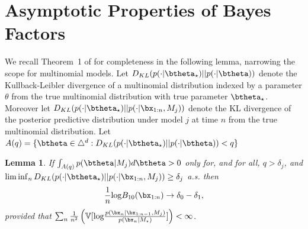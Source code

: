 \documentclass[11pt]{article}
\def\log{{\rm log}}
\newtheorem{lemma}{Lemma}[section]
\begin{document}
\section{Asymptotic Properties of Bayes Factors}
\label{app:asymptotics}
We recall Theorem~1 of \cite{walker} for completeness in the following lemma, narrowing the scope for multinomial models.
Let $D_{KL}(p(\cdot|\btheta_\star)||p(\cdot|\btheta) )$ denote the Kullback-Leibler divergence of a multinomial distribution indexed by a parameter $\theta$ from the true multinomial distribution with true parameter $\btheta_{\star}$.
Moreover let $D_{KL}(p(\cdot|\btheta_\star)||p(\cdot|\bx_{1:n}, M_j) )$ denote the KL divergence of the posterior predictive distribution under model $j$ at time $n$ from the true multinomial distribution.
Let $A(q) = \lbrace \btheta \in \triangle^d : D_{KL}(p(\cdot|\btheta_\star)||p(\cdot|\btheta) ) < q \rbrace$
\begin{lemma}
  \label{lemma:walker}
  If $\int_{A(q)} p(\btheta|M_j) d\btheta > 0$ only for, and for all, $q > \delta_j$, and $\lim \inf_n D_{KL}(p(\cdot|\btheta_\star)||p(\cdot|\bx_{1:n}, M_j) ) \geq \delta_j$ a.s.
then
  \begin{equation}
    \label{eq:bayes_factor_convergence}
    \frac{1}{n} \log B_{10}(\bx_{1:n}) \rightarrow \delta_0 - \delta_1,
  \end{equation}
  provided that $\sum_n \frac{1}{n^2} \left( \mathbb{V}[\log \frac{p(\bx_n|\bx_{1:n-1},M_j)}{p(\bx_n|M_\star )}]\right) < \infty$.
\end{lemma}
\end{document}
